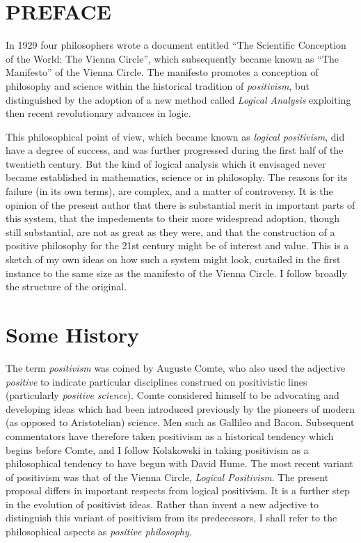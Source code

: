 \section*{PREFACE}

In 1929 four philosophers wrote a document entitled ``The Scientific Conception of the World: The Vienna Circle'', which subsequently became known as ``The Manifesto'' of the Vienna Circle.
The manifesto promotes a conception of philosophy and science within the historical tradition of \emph{positivism}, but distinguished by the adoption of a new method called \emph{Logical Analysis} exploiting then recent revolutionary advances in logic.

This philosophical point of view, which became known as \emph{logical positivism}, did have a degree of success, and was further progressed during the first half of the twentieth century.
But the kind of logical analysis which it envisaged never became established in mathematics, science or in philosophy.
The reasons for its failure (in its own terms), are complex, and a matter of controversy.
It is the opinion of the present author that there is substantial merit in important parts of this system, that the impedements to their more widespread adoption, though still substantial, are not as great as they were, and that the construction of a positive philosophy for the 21st century might be of interest and value.
This is a sketch of my own ideas on how such a system might look, curtailed in the first instance to the same size as the manifesto of the Vienna Circle.
I follow broadly the structure of the original.

\section{Some History}

The term \emph{positivism} was coined by Auguste Comte, who also used the adjective \emph{positive} to indicate particular disciplines construed on positivistic lines (particularly \emph{positive science}).
Comte considered himself to be advocating and developing ideas which had been introduced previously by the pioneers of modern (as opposed to Aristotelian) science.
Men such as Gallileo and Bacon.
Subsequent commentators have therefore taken positivism as a historical tendency which begins before Comte, and I follow Kolakowski in taking positivism as a philosophical tendency to have begun with David Hume.
The most recent variant of positivism was that of the Vienna Circle, \emph{Logical Positivism}.
The present proposal differs in important respects from logical positivism.
It is a further step in the evolution of positivist ideas.
Rather than invent a new adjective to distinguish this variant of positivism from its predecessors, I shall refer to the philosophical aspects as \emph{positive philosophy}.

